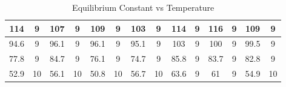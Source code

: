 \begin{table}[H]
{\begin{tabular}{|cccccccccccccc|}
\multicolumn{1}{|c|}{114}     & \multicolumn{1}{c|}{9}                                  & \multicolumn{1}{c|}{107}     & \multicolumn{1}{c|}{9}                                  & \multicolumn{1}{c|}{109}      & \multicolumn{1}{c|}{9}                                   & \multicolumn{1}{c|}{103}      & \multicolumn{1}{c|}{9}                                   & \multicolumn{1}{c|}{114}      & \multicolumn{1}{c|}{9}                                   & \multicolumn{1}{c|}{116}      & \multicolumn{1}{c|}{9}                                   & \multicolumn{1}{c|}{109}      & 9                                   \\ \hline
\multicolumn{1}{|c|}{94.6}    & \multicolumn{1}{c|}{9}                                  & \multicolumn{1}{c|}{96.1}    & \multicolumn{1}{c|}{9}                                  & \multicolumn{1}{c|}{96.1}     & \multicolumn{1}{c|}{9}                                   & \multicolumn{1}{c|}{95.1}     & \multicolumn{1}{c|}{9}                                   & \multicolumn{1}{c|}{103}      & \multicolumn{1}{c|}{9}                                   & \multicolumn{1}{c|}{100}      & \multicolumn{1}{c|}{9}                                   & \multicolumn{1}{c|}{99.5}     & 9                                   \\ \hline
\multicolumn{1}{|c|}{77.8}    & \multicolumn{1}{c|}{9}                                  & \multicolumn{1}{c|}{84.7}    & \multicolumn{1}{c|}{9}                                  & \multicolumn{1}{c|}{76.1}     & \multicolumn{1}{c|}{9}                                   & \multicolumn{1}{c|}{74.7}     & \multicolumn{1}{c|}{9}                                   & \multicolumn{1}{c|}{85.8}     & \multicolumn{1}{c|}{9}                                   & \multicolumn{1}{c|}{83.7}     & \multicolumn{1}{c|}{9}                                   & \multicolumn{1}{c|}{82.8}     & 9                                   \\ \hline
\multicolumn{1}{|c|}{52.9}    & \multicolumn{1}{c|}{10}                                 & \multicolumn{1}{c|}{56.1}    & \multicolumn{1}{c|}{10}                                 & \multicolumn{1}{c|}{50.8}     & \multicolumn{1}{c|}{10}                                  & \multicolumn{1}{c|}{56.7}     & \multicolumn{1}{c|}{10}                                  & \multicolumn{1}{c|}{63.6}     & \multicolumn{1}{c|}{9}                                   & \multicolumn{1}{c|}{61}       & \multicolumn{1}{c|}{9}                                   & \multicolumn{1}{c|}{54.9}     & 10                                  \\ \hline
\end{tabular}}
\caption{Equilibrium Constant vs Temperature}
\label{table:before_linearization}
\end{table}

